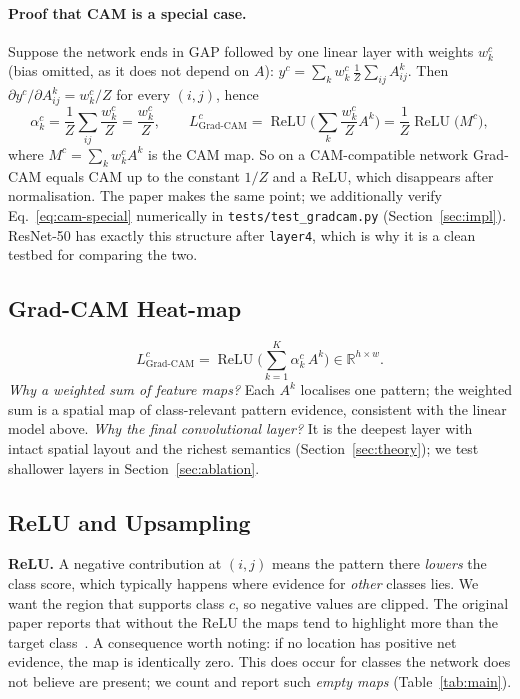 \documentclass[11pt,a4paper]{article}
\newcommand{\GC}{Grad-CAM}
\DeclareMathOperator{\ReLU}{ReLU}
\begin{document}
\paragraph{Proof that CAM is a special case.} Suppose the network ends in GAP followed by one linear layer with weights $w^c_k$ (bias omitted, as it does not depend on $A$): $y^c=\sum_k w^c_k\,\frac1Z\sum_{ij}A^k_{ij}$. Then $\partial y^c/\partial A^k_{ij}=w^c_k/Z$ for every $(i,j)$, hence
\begin{equation}
\alpha_k^c=\frac1Z\sum_{ij}\frac{w^c_k}{Z}=\frac{w^c_k}{Z},\qquad
L^c_{\text{\GC}}=\ReLU\Big(\sum_k\frac{w^c_k}{Z}A^k\Big)=\frac{1}{Z}\ReLU\big(M^c\big),
\label{eq:cam-special}
\end{equation}
where $M^c=\sum_k w^c_k A^k$ is the CAM map. So on a CAM-compatible network \GC{} equals CAM up to the constant $1/Z$ and a ReLU, which disappears after normalisation. The paper makes the same point; we additionally verify Eq.~\eqref{eq:cam-special} numerically in \texttt{tests/test\_gradcam.py} (Section~\ref{sec:impl}). ResNet-50 has exactly this structure after \texttt{layer4}, which is why it is a clean testbed for comparing the two.

\subsection{\GC{} Heat-map}
\begin{equation}
L^c_{\text{\GC}}=\ReLU\Big(\sum_{k=1}^{K}\alpha_k^c\,A^k\Big)\in\mathbb{R}^{h\times w}.
\label{eq:cam}
\end{equation}
\emph{Why a weighted sum of feature maps?} Each $A^k$ localises one pattern; the weighted sum is a spatial map of class-relevant pattern evidence, consistent with the linear model above. \emph{Why the final convolutional layer?} It is the deepest layer with intact spatial layout and the richest semantics (Section~\ref{sec:theory}); we test shallower layers in Section~\ref{sec:ablation}.

\subsection{ReLU and Upsampling}
\textbf{ReLU.} A negative contribution at $(i,j)$ means the pattern there \emph{lowers} the class score, which typically happens where evidence for \emph{other} classes lies. We want the region that supports class $c$, so negative values are clipped. The original paper reports that without the ReLU the maps tend to highlight more than the target class~\citep{selvaraju2017}. A consequence worth noting: if no location has positive net evidence, the map is identically zero. This does occur for classes the network does not believe are present; we count and report such \emph{empty maps} (Table~\ref{tab:main}).
\end{document}
